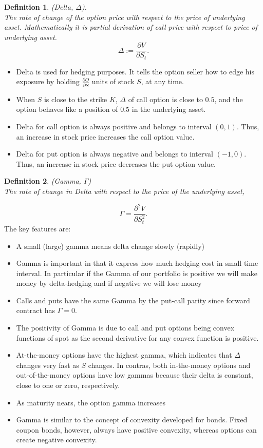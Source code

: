 \documentclass{book}
\newtheorem{definition}{Definition}[section]
\begin{document}
\begin{definition}(Delta, $\Delta$).\\
The rate of change of the option price with respect to the price of underlying asset. Mathematically it is partial derivation of call price with respect to price of underlying asset.
$$
\Delta:=\frac{\partial V}{\partial S_{t}}.
$$
\end{definition}
\begin{itemize}
\item Delta is used for hedging purposes. It tells the option seller how to edge his exposure by holding $\frac{\partial O}{\partial S}$ units of stock $S$, at any time.  
\item When $S$ is close to the strike $K$, $\Delta$ of call option is close to $0.5$, and the option behaves like a position of $0.5$ in the underlying asset.
\item Delta for call option is always positive and belongs to interval $(0,1)$. Thus, an increase in stock price increases the call option value.
\item Delta for put option is always negative and belongs to interval $(-1,0)$. Thus, an increase in stock price decreases the put option value.
\end{itemize}

\begin{definition}(Gamma, $\Gamma$)\\
The rate of change in Delta with respect to the price of the underlying asset,
\end{definition}
$$
\Gamma=\frac{\partial^{2}V}{\partial S_{t}^{2}}.
$$
The key features are:
\begin{itemize}
\item A small (large) gamma means delta change slowly (rapidly)
\item Gamma is important in that it express how much hedging cost in small time interval. In particular if the Gamma of our portfolio is positive we will make money by delta-hedging and if negative we will lose money
\item Calls and puts have the same Gamma by the put-call parity since forward contract has $\Gamma=0.$
\item The positivity of Gamma is due to call and put options being convex functions of spot as the second derivative for any convex function is positive.
\item At-the-money options have the highest gamma, which indicates that $\Delta$ changes very fast as $S$ changes. In contras, both in-the-money options and out-of-the-money options have low gammas because their delta is constant, close to one or zero, respectively. 
\item As maturity nears, the option gamma increases
\item Gamma is similar to the concept of convexity developed for bonds. Fixed coupon bonds, however, always have positive convexity, whereas options can create negative convexity.
\end{itemize}
\end{document}
